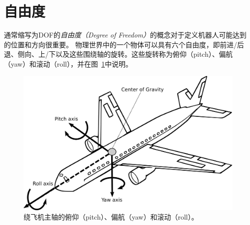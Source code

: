\section{自由度}\label{sec:dof}


通常缩写为DOF的\emph{自由度（Degree of Freedom）}的概念对于定义机器人可能达到的位置和方向很重要。 物理世界中的一个物体可以具有六个自由度，即前进/后退、侧向、上/下以及这些围绕轴的旋转。这些旋转称为俯仰（pitch）、偏航（yaw）和滚动（roll），并在图~\ref{fig:pitchyawandroll}中说明。

\begin{figure}
	\centering
		\includegraphics[width=\textwidth]{figs/pitchyawroll.png}
	\caption{绕飞机主轴的俯仰（pitch）、偏航（yaw）和滚动（roll）。}
	\label{fig:pitchyawandroll}
\end{figure}


